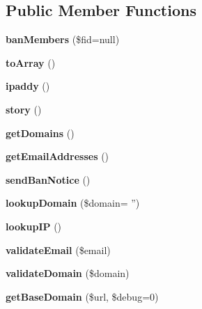 \subsection*{Public Member Functions}
\begin{DoxyCompactItemize}
\item 
\hypertarget{classban_members_a7ad0fb77b7955e1717722dad5f453135}{{\bfseries ban\-Members} (\$fid=null)}\label{classban_members_a7ad0fb77b7955e1717722dad5f453135}

\item 
\hypertarget{classban_members_a658defb34762c8f40085aec87e16ba1a}{{\bfseries to\-Array} ()}\label{classban_members_a658defb34762c8f40085aec87e16ba1a}

\item 
\hypertarget{classban_members_a9806a032ce31e96ccd75cd6d61a8e656}{{\bfseries ipaddy} ()}\label{classban_members_a9806a032ce31e96ccd75cd6d61a8e656}

\item 
\hypertarget{classban_members_abd3045226e27a02dff5dbdcbfc8b5b7c}{{\bfseries story} ()}\label{classban_members_abd3045226e27a02dff5dbdcbfc8b5b7c}

\item 
\hypertarget{classban_members_aa77ff496620f810daf64f6b937238054}{{\bfseries get\-Domains} ()}\label{classban_members_aa77ff496620f810daf64f6b937238054}

\item 
\hypertarget{classban_members_a9c9e47c6789f8e5d0e1ffd8377e42cf5}{{\bfseries get\-Email\-Addresses} ()}\label{classban_members_a9c9e47c6789f8e5d0e1ffd8377e42cf5}

\item 
\hypertarget{classban_members_a24e849aa7212d560be04d7ed4d710dd4}{{\bfseries send\-Ban\-Notice} ()}\label{classban_members_a24e849aa7212d560be04d7ed4d710dd4}

\item 
\hypertarget{classban_members_ac0cf4fe074df6ef434dfb94eb13093a6}{{\bfseries lookup\-Domain} (\$domain= '')}\label{classban_members_ac0cf4fe074df6ef434dfb94eb13093a6}

\item 
\hypertarget{classban_members_ada9fe044fff09870f37a877c78ffdb3f}{{\bfseries lookup\-I\-P} ()}\label{classban_members_ada9fe044fff09870f37a877c78ffdb3f}

\item 
\hypertarget{classban_members_a7dd20da0d428d94fa4dad40bf7e90887}{{\bfseries validate\-Email} (\$email)}\label{classban_members_a7dd20da0d428d94fa4dad40bf7e90887}

\item 
\hypertarget{classban_members_a3ef26d87b4a2dad61ca59b61929f09c5}{{\bfseries validate\-Domain} (\$domain)}\label{classban_members_a3ef26d87b4a2dad61ca59b61929f09c5}

\item 
\hypertarget{classban_members_ab299ded1c570d761b2659c318af92320}{{\bfseries get\-Base\-Domain} (\$url, \$debug=0)}\label{classban_members_ab299ded1c570d761b2659c318af92320}

\end{DoxyCompactItemize}

